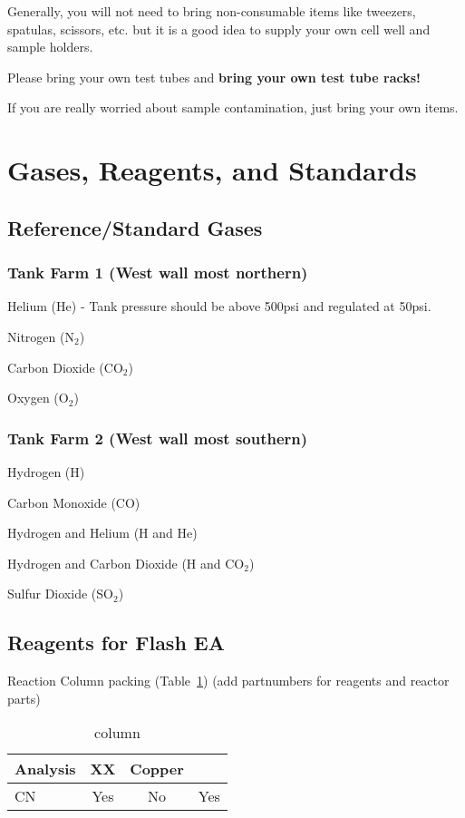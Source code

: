 \documentclass[12pt]{../SOP3}\usepackage[]{graphicx}\usepackage[]{color}
\begin{document}
\NP Generally, you will not need to bring non-consumable items like tweezers, spatulas, scissors, etc. but it is a good idea to supply your own cell well and sample holders.

\NP Please bring your own test tubes and \textbf{bring your own test tube racks!}

\NP If you are really worried about sample contamination, just bring your own items.

\section{Gases, Reagents, and Standards}

\subsection{Reference/Standard Gases}

\subsubsection{Tank Farm 1 (West wall most northern)}

\NP Helium (He) - Tank pressure should be above 500psi and regulated at 50psi.

\NP Nitrogen (N$_2$)

\NP Carbon Dioxide (CO$_2$)

\NP Oxygen (O$_2$)

\subsubsection{Tank Farm 2 (West wall most southern)}

\NP Hydrogen (H)

\NP Carbon Monoxide (CO)

\NP Hydrogen and Helium (H and He)

\NP Hydrogen and Carbon Dioxide (H and CO$_2$)

\NP Sulfur Dioxide (SO$_2$)

\subsection{Reagents for Flash EA} \label{subsec:Reagents for Flash EA}

\NP Reaction Column packing (Table~\ref{column}) (add partnumbers for reagents and reactor parts)

\begin{table}[h]
\label{column}
\caption{column}
\centering
\begin{tabular}{lccc} \hline
Analysis      & XX    & Copper  & \\ \hline\hline
CN            & Yes   & No      & Yes \\ \hline


\end{tabular}
\end{table}
\end{document}
